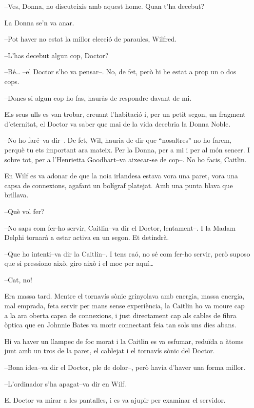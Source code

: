 --Ves, Donna, no discuteixis amb aquest home. Quan t'ha decebut?

La Donna se'n va anar.

--Pot haver no estat la millor elecció de paraules, Wilfred.

--L'has decebut algun cop, Doctor?

--Bé\ldots{} --el Doctor s'ho va pensar--. No, de fet, però hi he estat
a prop un o dos cops.

--Doncs si algun cop ho fas, hauràs de respondre davant de mi.

Els seus ulls es van trobar, creuant l'habitació i, per un petit segon,
un fragment d'eternitat, el Doctor va saber que mai de la vida decebria
la Donna Noble.

--No ho faré--va dir--. De fet, Wil, hauria de dir que ``nosaltres'' no
ho farem, perquè tu ets important ara mateix. Per la Donna, per a mi i
per al món sencer. I sobre tot, per a l'Henrietta Goodhart--va
aixecar-se de cop--. No ho facis, Caitlin.

En Wilf es va adonar de que la noia irlandesa estava vora una paret,
vora una capsa de connexions, agafant un bolígraf platejat. Amb una
punta blava que brillava.

--Què vol fer?

--No saps com fer-ho servir, Caitlin--va dir el Doctor, lentament--. I
la Madam Delphi tornarà a estar activa en un segon. Et detindrà.

--Que ho intenti--va dir la Caitlin--. I tens raó, no sé com fer-ho
servir, però suposo que si pressiono això, giro això i el moc per
aquí\ldots{}

--Cat, no!

Era massa tard. Mentre el tornavís sònic grinyolava amb energia, massa
energia, mal emprada, feta servir per mans sense experiència, la Caitlin
ho va moure cap a la ara oberta capsa de connexions, i just directament
cap als cables de fibra òptica que en Johnnie Bates va morir connectant
feia tan sols uns dies abans.

Hi va haver un llampec de foc morat i la Caitlin es va esfumar, reduïda
a àtoms junt amb un tros de la paret, el cablejat i el tornavís sònic
del Doctor.

--Bona idea--va dir el Doctor, ple de dolor--, però havia d'haver una
forma millor.

--L'ordinador s'ha apagat--va dir en Wilf.

El Doctor va mirar a les pantalles, i es va ajupir per examinar el
servidor.

